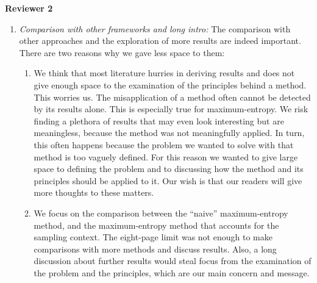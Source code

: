 \documentclass{article}
\begin{document}
\textbf{Reviewer 2}
\begin{enumerate}[wide]
\item \emph{Comparison with other frameworks and long intro:} The
  comparison with other approaches and the exploration of more results are
  indeed important. There are two reasons why we gave less space to them:
  \begin{enumerate}[label=\alph*.,itemsep=0ex]
  \item We think that most literature hurries in deriving results and does
    not give enough space to the examination of the principles behind a
    method. This worries us. The misapplication of a method often cannot be
    detected by its results alone. This is especially true for
    maximum-entropy. We risk finding a plethora of results that may even
    look interesting but are meaningless, because the method was not
    meaningfully applied. In turn, this often happens because the problem
    we wanted to solve with that method is too vaguely defined. For this
    reason we wanted to give large space to defining the problem and to
    discussing how the method and its principles should be applied to it.
    Our wish is that our readers will give more thoughts to these matters.
  \item We focus on the comparison between the \enquote{naive}
    maximum-entropy method, and the maximum-entropy method that accounts
    for the sampling context. The eight-page limit was not enough to make
    comparisons with more methods and discuss results. Also, a long
    discussion about further results would steal focus from the examination
    of the problem and the principles, which are our main concern and message.
  \end{enumerate}



\end{enumerate}
\end{document}
